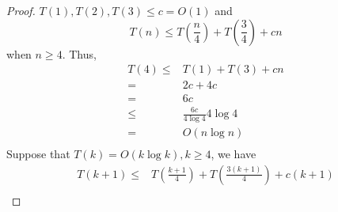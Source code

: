 \documentclass{article}
\begin{document}
    \section{}
    \begin{proof}
        $T(1),T(2), T(3)\leq c=O(1)$ and 
        \begin{equation}
            T(n)\leq T(\frac{n}{4})+T(\frac{3}{4})+cn
        \end{equation}
        when $n\geq 4$. Thus,
        \begin{equation}
            \begin{split}
                T(4)\leq &T(1)+T(3)+cn\\
                    =&2c+4c\\
                    =&6c\\
                    \leq& \frac{6c}{4\log 4} 4 \log 4\\
                    =&O(n\log n)\\
            \end{split}
        \end{equation}
        Suppose that $T(k)=O(k\log k), k\geq 4$, we have
        \begin{equation}
            \begin{split}
                T(k+1)\leq&T(\frac{k+1}{4})+T(\frac{3(k+1)}{4})+c(k+1)\\
            \end{split}
        \end{equation}
    \end{proof}
\end{document}
